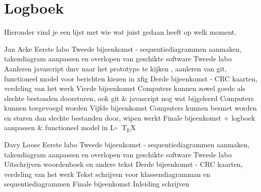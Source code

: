 \documentclass[a4paper,oneside]{report}
\def\latex{$\mathrm{L\!\!^{{}_{\scriptstyle A}} \!\!\!\!\!\;\; T\!_{\displaystyle E} \!
X}$}
\begin{document}
\chapter{Logboek}
Hieronder vind je een lijst met wie wat juist gedaan heeft op welk moment.
\begin{studentlog}{Jan Acke}
{Eerste labo}
{Tweede bijeenkomst - sequentiediagrammen aanmaken, takendiagram aanpassen en overlopen van geschikte software}
{Tweede labo}
{Aanleren javascript dmv naar het prototype te kijken , aanleren van git, functioneel model voor berichten kiezen in xfig}
{Derde bijeenkomst - CRC kaarten, verdeling van het werk}
{Vierde bijeenkomst}
{Computers kunnen zowel goede als slechte bestanden doorsturen, ook git \& javascript nog wat bijgeleerd}
{Computers kunnen toegevoegd worden}
{Vijfde bijeenkomst}
{Computers kunnen besmet worden en sturen dan slechte bestanden door, wipen werkt}
{Finale bijeenkomst + logboek aanpassen \& functioneel model in \latex}
\end{studentlog}

\begin{studentlog}{Davy Loose}
{Eerste labo}
{Tweede bijeenkomst - sequentiediagrammen aanmaken, takendiagram aanpassen en overlopen van geschikte software}
{Tweede labo}
{Uitschrijven woordenboek en andere tekst}
{Derde bijeenkomst - CRC kaarten, verdeling van het werk}
{Tekst schrijven voor klassendiagramman en sequentiediagrammen}
{Finale bijeenkomst}
{Inleiding schrijven}
\end{studentlog}
\end{document}
